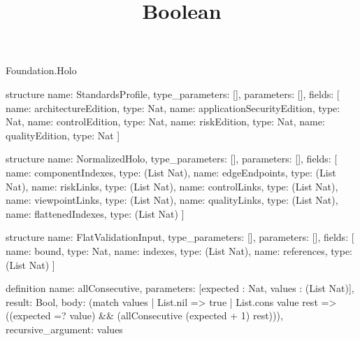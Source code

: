 \begin{lexlean}{Foundation.Holo}
\title{Boolean}
\begin{semanticmodule}
structure{
  name: StandardsProfile,
  type_parameters: [],
  parameters: [],
  fields: [
    {name: architectureEdition, type: Nat},
    {name: applicationSecurityEdition, type: Nat},
    {name: controlEdition, type: Nat},
    {name: riskEdition, type: Nat},
    {name: qualityEdition, type: Nat}
  ]
}

structure{
  name: NormalizedHolo,
  type_parameters: [],
  parameters: [],
  fields: [
    {name: componentIndexes, type: (List Nat)},
    {name: edgeEndpoints, type: (List Nat)},
    {name: riskLinks, type: (List Nat)},
    {name: controlLinks, type: (List Nat)},
    {name: viewpointLinks, type: (List Nat)},
    {name: qualityLinks, type: (List Nat)},
    {name: flattenedIndexes, type: (List Nat)}
  ]
}

structure{
  name: FlatValidationInput,
  type_parameters: [],
  parameters: [],
  fields: [
    {name: bound, type: Nat},
    {name: indexes, type: (List Nat)},
    {name: references, type: (List Nat)}
  ]
}

definition{
  name: allConsecutive,
  parameters: [expected : Nat, values : (List Nat)],
  result: Bool,
  body: (match values
    | List.nil => true
    | List.cons value rest => ((expected =? value) && (allConsecutive (expected + 1) rest))),
  recursive_argument: values
}


\end{semanticmodule}
\end{lexlean}

